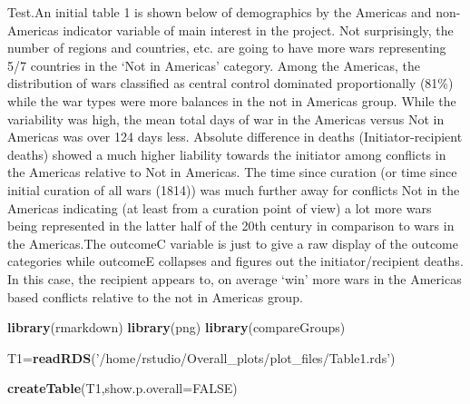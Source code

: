 \documentclass[
]{article}
\newenvironment{Shaded}{\begin{snugshade}}{\end{snugshade}}
\newcommand{\DataTypeTok}[1]{\textcolor[rgb]{0.13,0.29,0.53}{#1}}
\newcommand{\KeywordTok}[1]{\textcolor[rgb]{0.13,0.29,0.53}{\textbf{#1}}}
\newcommand{\NormalTok}[1]{#1}
\newcommand{\OtherTok}[1]{\textcolor[rgb]{0.56,0.35,0.01}{#1}}
\newcommand{\StringTok}[1]{\textcolor[rgb]{0.31,0.60,0.02}{#1}}
\begin{document}
Test.An initial table 1 is shown below of demographics by the Americas
and non-Americas indicator variable of main interest in the project. Not
surprisingly, the number of regions and countries, etc. are going to
have more wars representing 5/7 countries in the `Not in Americas'
category. Among the Americas, the distribution of wars classified as
central control dominated proportionally (81\%) while the war types were
more balances in the not in Americas group. While the variability was
high, the mean total days of war in the Americas versus Not in Americas
was over 124 days less. Absolute difference in deaths
(Initiator-recipient deaths) showed a much higher liability towards the
initiator among conflicts in the Americas relative to Not in Americas.
The time since curation (or time since initial curation of all wars
(1814)) was much further away for conflicts Not in the Americas
indicating (at least from a curation point of view) a lot more wars
being represented in the latter half of the 20th century in comparison
to wars in the Americas.The outcomeC variable is just to give a raw
display of the outcome categories while outcomeE collapses and figures
out the initiator/recipient deaths. In this case, the recipient appears
to, on average `win' more wars in the Americas based conflicts relative
to the not in Americas group.

\begin{Shaded}
\begin{Highlighting}[]
\KeywordTok{library}\NormalTok{(rmarkdown)}
\KeywordTok{library}\NormalTok{(png)}
\KeywordTok{library}\NormalTok{(compareGroups)}

\NormalTok{T1=}\KeywordTok{readRDS}\NormalTok{(}\StringTok{'/home/rstudio/Overall_plots/plot_files/Table1.rds'}\NormalTok{)}

\KeywordTok{createTable}\NormalTok{(T1,}\DataTypeTok{show.p.overall=}\OtherTok{FALSE}\NormalTok{)}
\end{Highlighting}
\end{Shaded}
\end{document}
